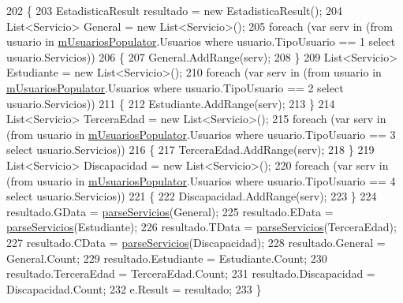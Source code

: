 \begin{DoxyCode}
202         \{
203             EstadisticaResult resultado = \textcolor{keyword}{new} EstadisticaResult();
204             List<Servicio> General = \textcolor{keyword}{new} List<Servicio>();
205             \textcolor{keywordflow}{foreach} (var serv \textcolor{keywordflow}{in} (from usuario \textcolor{keywordflow}{in} \hyperlink{class_proyecto___integrador__3_1_1_reportes_1_1_reporte_frecuencia_de_uso_ad66e9ccc04488afa646ac2e65bf7db35}{mUsuariosPopulator}.Usuarios where 
      usuario.TipoUsuario == 1 select usuario.Servicios))
206             \{
207                 General.AddRange(serv);
208             \}
209             List<Servicio> Estudiante = \textcolor{keyword}{new} List<Servicio>();
210             \textcolor{keywordflow}{foreach} (var serv \textcolor{keywordflow}{in} (from usuario \textcolor{keywordflow}{in} \hyperlink{class_proyecto___integrador__3_1_1_reportes_1_1_reporte_frecuencia_de_uso_ad66e9ccc04488afa646ac2e65bf7db35}{mUsuariosPopulator}.Usuarios where 
      usuario.TipoUsuario == 2 select usuario.Servicios))
211             \{
212                 Estudiante.AddRange(serv);
213             \}
214             List<Servicio> TerceraEdad = \textcolor{keyword}{new} List<Servicio>();
215             \textcolor{keywordflow}{foreach} (var serv \textcolor{keywordflow}{in} (from usuario \textcolor{keywordflow}{in} \hyperlink{class_proyecto___integrador__3_1_1_reportes_1_1_reporte_frecuencia_de_uso_ad66e9ccc04488afa646ac2e65bf7db35}{mUsuariosPopulator}.Usuarios where 
      usuario.TipoUsuario == 3 select usuario.Servicios))
216             \{
217                 TerceraEdad.AddRange(serv);
218             \}
219             List<Servicio> Discapacidad = \textcolor{keyword}{new} List<Servicio>();
220             \textcolor{keywordflow}{foreach} (var serv \textcolor{keywordflow}{in} (from usuario \textcolor{keywordflow}{in} \hyperlink{class_proyecto___integrador__3_1_1_reportes_1_1_reporte_frecuencia_de_uso_ad66e9ccc04488afa646ac2e65bf7db35}{mUsuariosPopulator}.Usuarios where 
      usuario.TipoUsuario == 4 select usuario.Servicios))
221             \{
222                 Discapacidad.AddRange(serv);
223             \}
224             resultado.GData = \hyperlink{class_proyecto___integrador__3_1_1_reportes_1_1_reporte_frecuencia_de_uso_ad858394f90552b0c6240293e2acf2bdd}{parseServicios}(General);
225             resultado.EData = \hyperlink{class_proyecto___integrador__3_1_1_reportes_1_1_reporte_frecuencia_de_uso_ad858394f90552b0c6240293e2acf2bdd}{parseServicios}(Estudiante);
226             resultado.TData = \hyperlink{class_proyecto___integrador__3_1_1_reportes_1_1_reporte_frecuencia_de_uso_ad858394f90552b0c6240293e2acf2bdd}{parseServicios}(TerceraEdad);
227             resultado.CData = \hyperlink{class_proyecto___integrador__3_1_1_reportes_1_1_reporte_frecuencia_de_uso_ad858394f90552b0c6240293e2acf2bdd}{parseServicios}(Discapacidad);
228             resultado.General = General.Count;
229             resultado.Estudiante = Estudiante.Count;
230             resultado.TerceraEdad = TerceraEdad.Count;
231             resultado.Discapacidad = Discapacidad.Count;
232             e.Result = resultado;
233         \}
\end{DoxyCode}

